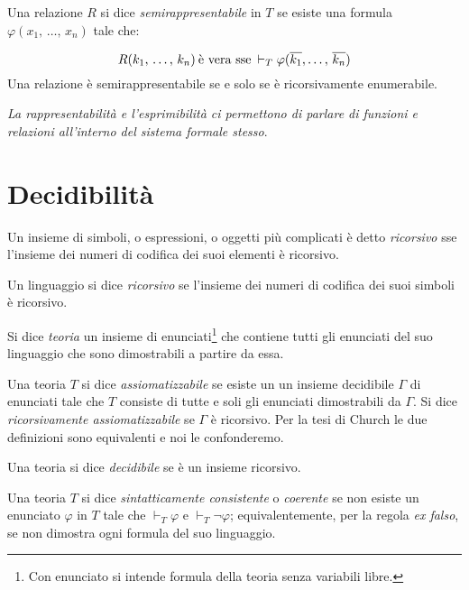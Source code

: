 	Una relazione $R$ si dice \textit{\emph{semirappresentabile}} in $T$
	se esiste una formula $\varphi(x_1,\,\dots,\,x_n)$ tale che:
	
	$$
	R(k_1,\,\dots,\,k_n) \mbox{\:\`e vera sse\:} \vdash_T\varphi(\overline{k_1},\dots,\,
	\overline{k_n})
	$$
	Una relazione \`e semirappresentabile se e solo se \`e ricorsivamente enumerabile.
	
	\textit{La rappresentabilit\`a e l'esprimibilit\`a ci permettono di parlare
	di funzioni e relazioni all'interno del sistema formale stesso}.
	
\section{Decidibilit\`a}
	
	\begin{defi}
		Un insieme di simboli, o espressioni, o oggetti pi\`u complicati \`e detto
		\emph{ricorsivo} sse l'insieme dei numeri di codifica
		dei suoi elementi \`e ricorsivo.
	\end{defi}
	
	\begin{defi}
		Un linguaggio si dice \emph{ricorsivo} se
		l'insieme dei numeri di codifica dei suoi simboli \`e ricorsivo.
	\end{defi}

	\begin{defi}
		Si dice \emph{teoria} un insieme di enunciati\footnote{Con enunciato
		si intende formula della teoria senza variabili libre.} che contiene
		tutti gli enunciati del suo linguaggio che sono dimostrabili a partire
		da essa.
	\end{defi}
	
	\begin{defi}
		Una teoria $T$ si dice \emph{assiomatizzabile} se esiste un
		un insieme decidibile $\Gamma$ di enunciati  tale che $T$ consiste
		di tutte e soli gli enunciati dimostrabili da $\Gamma$. Si dice
		\emph{ricorsivamente assiomatizzabile} se $\Gamma$ \`e ricorsivo.
		Per la tesi di Church le due definizioni sono equivalenti e noi le
		confonderemo.
	\end{defi}
	
	\begin{defi}
		Una teoria si dice \emph{decidibile} se \`e un insieme ricorsivo.
	\end{defi}
	
	\begin{defi}
		Una teoria $T$ si dice \emph{\textit{sintatticamente consistente}} o
		\emph{\textit{coerente}}
		se non esiste un enunciato $\varphi$ in $T$ tale che $\vdash_{T}\varphi$
		e $\vdash_{T}\neg\varphi$; equivalentemente, per la regola \textit{ex falso},
		se non dimostra ogni formula del suo linguaggio.
	\end{defi}
		
